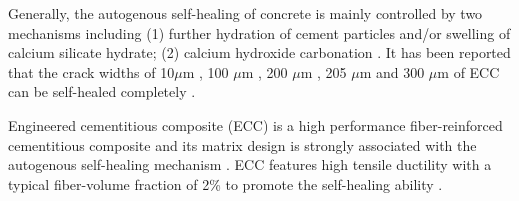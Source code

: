 \documentclass[11pt]{article}
\begin{document}

Generally, the autogenous self-healing of concrete is mainly controlled by two mechanisms including (1) further hydration of cement particles and/or swelling of calcium silicate hydrate; (2) calcium hydroxide carbonation \cite{edvardsen1999water,tang2016selfhealing}. It has been reported that the crack widths of 10$\mu$m \cite{jacobsen1995sem}, 100 $\mu$m \cite{reinhardt2003permeability}, 200 $\mu$m \cite{csahmaran2008influence}, 205 $\mu$m \cite{edvardsen1999water} and 300 $\mu$m \cite{clear1985effects} of ECC can be self-healed completely \cite{sahmaran2013self}. 
	
	
	Engineered cementitious composite (ECC) is a high performance fiber-reinforced cementitious composite and its matrix design is strongly associated with the autogenous self-healing mechanism \cite{kamada2000effects}. ECC features high tensile ductility with a typical fiber-volume fraction of 2\%  \cite{li1998innovations,ozbay2013self} to promote the self-healing ability \cite{tang2015robust}. 
	
\end{document}
